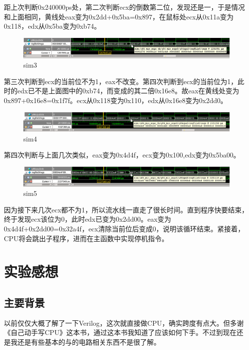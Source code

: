 距上次判断0x240000ps处，第二次判断ecx的倒数第二位，发现还是一，于是情况和上面相同，黄线处eax变为0x2dd+0x5ba=0x897，在鼠标处ecx从0x11a变为0x118，edx从0x5ba变为0xb74。

\begin{figure}[htbp]
\centering
\includegraphics{img/sim3.png}
\caption{sim3}
\end{figure}

第三次判断到ecx的当前位不为1，eax不改变。第四次判断到ecx的当前位为1，此时的edx已不是上面图中的0xb74，而变成的其二倍0x16e8。故eax在黄线处变为0x897+0x16e8=0x1f7f。ecx从0x118变为0x110，edx从0x16e8变为0x2dd0。

\begin{figure}[htbp]
\centering
\includegraphics{img/sim4.png}
\caption{sim4}
\end{figure}

第四次判断与上面几次类似，eax变为0x4d4f，ecx变为0x100,edx变为0x5ba00。

\begin{figure}[htbp]
\centering
\includegraphics{img/sim5.png}
\caption{sim5}
\end{figure}

因为接下来几次ecx都不为1，所以流水线一直走了很长时间。直到程序快要结束，终于发现ecx该位为0，此时edx已变为0x2dd00。eax变为0x4d4f+0x2dd00=0x32a4f，ecx清除当前位后变成0，说明该循环结束。紧接着，CPU将会跳出子程序，进而在主函数中实现停机指令。

\section{实验感想}\label{ux5b9eux9a8cux611fux60f3}

\subsection{主要背景}\label{ux4e3bux8981ux80ccux666f}

以前仅仅大概了解了一下Verilog，这次就直接做CPU，确实跨度有点大。但多谢《自己动手写CPU》这本书，通过这本书我知道了应该如何下手。不过到现在还是我还是有些基本的与的电路相关东西不是很了解。

